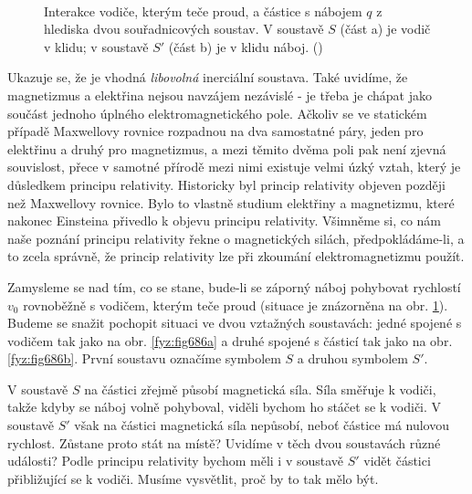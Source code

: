     \begin{figure}[ht!]  %
      \centering
       \\
      \caption{Interakce vodiče, kterým teče proud, a částice s nábojem \(q\) z hlediska dvou
              souřadnicových soustav. V soustavě \(S\) (část a) je vodič v klidu; v soustavě \(S'\)
              (část b) je v klidu náboj. (\cite[s.~234]{Feynman02})}
      \label{fyz:fig686}
    \end{figure}

    Ukazuje se, že je vhodná \emph{libovolná} inerciální soustava. Také uvidíme, že magnetizmus a
    elektřina nejsou navzájem nezávislé - je třeba je chápat jako součást jednoho úplného
    elektromagnetického pole. Ačkoliv se ve statickém případě Maxwellovy rovnice rozpadnou na dva
    samostatné páry, jeden pro elektřinu a druhý pro magnetizmus, a mezi těmito dvěma poli pak není
    zjevná souvislost, přece v samotné přírodě mezi nimi existuje velmi úzký vztah, který je
    důsledkem principu relativity. Historicky byl princip relativity objeven později než Maxwellovy
    rovnice. Bylo to vlastně studium elektřiny a magnetizmu, které nakonec Einsteina přivedlo k
    objevu principu relativity. Všimněme si, co nám naše poznání principu relativity řekne o
    magnetických silách, předpokládáme-li, a to zcela správně, že princip relativity lze při
    zkoumání elektromagnetizmu použít.

    Zamysleme se nad tím, co se stane, bude-li se záporný náboj pohybovat rychlostí \(v_0\)
    rovnoběžně s vodičem, kterým teče proud (situace je znázorněna na obr. \ref{fyz:fig686}). Budeme
    se snažit pochopit situaci ve dvou vztažných soustavách: jedné spojené s vodičem tak jako na
    obr. \ref{fyz:fig686a} a druhé spojené s částicí tak jako na obr. \ref{fyz:fig686b}. První
    soustavu označíme symbolem \(S\) a druhou symbolem \(S'\).

    V soustavě \(S\) na částici zřejmě působí magnetická síla. Síla směřuje k vodiči, takže kdyby se
    náboj volně pohyboval, viděli bychom ho stáčet se k vodiči. V soustavě \(S'\) však na částici
    magnetická síla nepůsobí, neboť částice má nulovou rychlost. Zůstane proto stát na místě?
    Uvidíme v těch dvou soustavách různé události? Podle principu relativity bychom měli i v
    soustavě \(S'\) vidět částici přibližující se k vodiči. Musíme vysvětlit, proč by to tak mělo
    být.

